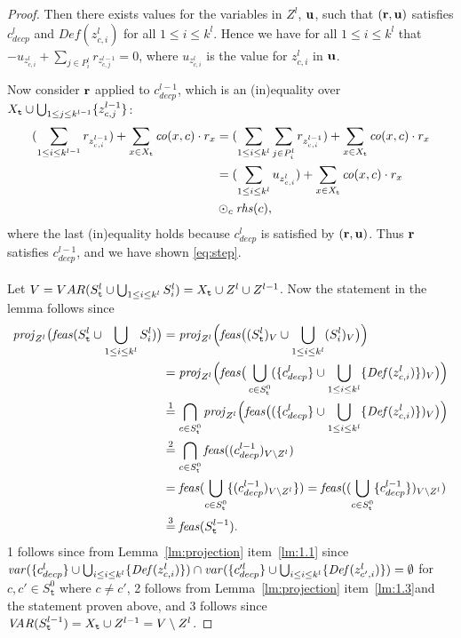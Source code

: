 \begin{proof}
Then there exists values for the variables in $Z^l$, $\mathbf{u}$, such that $(\mathbf{r},\mathbf{u})$ satisfies $c^l_{decp}$ and $\mathit{Def}(z^l_{c,i})$ for all $1\leq i\leq k^l$. Hence we have for all $1\leq i \leq k^l$ that $-u_{z^l_{c,i}}+\sum_{j\in P^l_i}r_{z^{l-1}_{c,j}} = 0$, where $u_{z^l_{c,i}}$ is the value for $z^l_{c,i}$ in $\mathbf{u}$. 

Now consider $\mathbf{r}$ applied to $c^{l-1}_{decp}$, which is an (in)equality over $X_{\texttt{t}}\cup\bigcup_{1\leq j\leq k^{l-1}}\{z^{l-1}_{c,j}\}$:
\begin{align*}
(\sum_{1\leq i \leq k^{l-1}}r_{z^{l-1}_{c,i}}) + \sum_{x\in X_{\texttt{t}}}\mathit{co}(x,c)\cdot r_x
&= (\sum_{1\leq i \leq k^l}\sum_{j\in P^l_i}r_{z^{l-1}_{c,i}}) + \sum_{x\in X_{\texttt{t}}}\mathit{co}(x,c)\cdot r_x\\
&= (\sum_{1\leq i \leq k^{l}}u_{z^{l}_{c,i}}) + \sum_{x\in X_{\texttt{t}}}\mathit{co}(x,c)\cdot r_x\\
&\odot_c \mathit{rhs}(c),
\end{align*}
where the last (in)equality holds because $c^l_{decp}$ is satisfied by $(\mathbf{r},\mathbf{u})$. 
Thus $\mathbf{r}$ satisfies $c^{l-1}_{decp}$, and we have shown \eqref{eq:step}.
\\\\
Let $V = VAR(S^l_{\texttt{t}}\cup\bigcup_{1\leq i\leq k^l} S^l_i) = X_{\texttt{t}}\cup Z^l \cup Z^{l-1}$. Now the statement in the lemma follows since
\begin{align*}
\mathit{proj}_{Z^l}\big(\mathit{feas}(S^l_{\texttt{t}} \cup\bigcup_{1\leq i\leq k^l}S^l_i)\big)
&=\mathit{proj}_{Z^l}\Big(\mathit{feas}\big((S^l_{\texttt{t}})_V \cup\bigcup_{1\leq i\leq k^l}(S^l_i)_V\big)\Big)\\
&=\mathit{proj}_{Z^l}\Big(\mathit{feas}\big(\bigcup_{c\in S^0_{\texttt{t}}}(\{c_{decp}^{l}\}\cup\bigcup_{1\leq i\leq k^l}\{\mathit{Def}(z^l_{c,i})\})_V\big)\Big)\\
&\overset{1}= \bigcap_{c\in S^0_{\texttt{t}}}\mathit{proj}_{Z^l}\Big(\mathit{feas}\big((\{c_{decp}^{l}\}\cup\bigcup_{1\leq i\leq k^l}\{\mathit{Def}(z^l_{c,i})\})_V\big)\Big)\\
&\overset{2}= \bigcap_{c\in S^0_{\texttt{t}}}\mathit{feas}((c_{decp}^{l-1})_{V\setminus Z^l})\\
&= \mathit{feas}(\bigcup_{c\in S^0_{\texttt{t}}}\{(c_{decp}^{l-1})_{V\setminus Z^l}\})
= \mathit{feas}((\bigcup_{c\in S^0_{\texttt{t}}}\{c_{decp}^{l-1}\})_{V\setminus Z^l})\\
&\overset{3}= \mathit{feas}(S^{l-1}_{\texttt{t}}).
\end{align*}
1 follows since from Lemma~\ref{lm:projection} item~\ref{lm:1.1} since $\mathit{var}(\{c^l_{decp}\}\cup\bigcup_{i\leq i\leq k^l}\{\mathit{Def}(z^l_{c,i})\})\cap\mathit{var}(\{c'^l_{decp}\}\cup\bigcup_{i\leq i\leq k^l}\{\mathit{Def}(z^l_{c',i})\})=\emptyset$ for $c,c'\in S^0_\texttt{t}$ where $c\neq c'$, 2 follows from Lemma~\ref{lm:projection} item~\ref{lm:1.3}and the statement proven above, and 3 follows since $\mathit{VAR}(S^{l-1}_{\texttt{t}}) = X_{\texttt{t}}\cup Z^{l-1} = V\setminus Z^l$. 
\end{proof}

